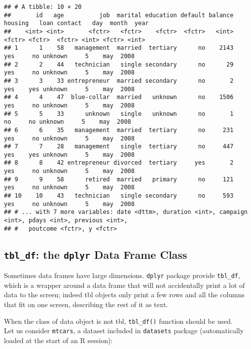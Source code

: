 \documentclass[]{book}
\begin{document}
\begin{verbatim}
## # A tibble: 10 × 20
##       id   age          job  marital education default balance housing   loan contact   day  month  year
##    <int> <int>       <fctr>   <fctr>    <fctr>  <fctr>   <int>  <fctr> <fctr>  <fctr> <int> <fctr> <int>
## 1      1    58   management  married  tertiary      no    2143     yes     no unknown     5    may  2008
## 2      2    44   technician   single secondary      no      29     yes     no unknown     5    may  2008
## 3      3    33 entrepreneur  married secondary      no       2     yes    yes unknown     5    may  2008
## 4      4    47  blue-collar  married   unknown      no    1506     yes     no unknown     5    may  2008
## 5      5    33      unknown   single   unknown      no       1      no     no unknown     5    may  2008
## 6      6    35   management  married  tertiary      no     231     yes     no unknown     5    may  2008
## 7      7    28   management   single  tertiary      no     447     yes    yes unknown     5    may  2008
## 8      8    42 entrepreneur divorced  tertiary     yes       2     yes     no unknown     5    may  2008
## 9      9    58      retired  married   primary      no     121     yes     no unknown     5    may  2008
## 10    10    43   technician   single secondary      no     593     yes     no unknown     5    may  2008
## # ... with 7 more variables: date <dttm>, duration <int>, campaign <int>, pdays <int>, previous <int>,
## #   poutcome <fctr>, y <fctr>
\end{verbatim}

\subsection{\texorpdfstring{\texttt{tbl\_df}: the \texttt{dplyr} Data
Frame
Class}{tbl\_df: the dplyr Data Frame Class}}\label{tbl_df-the-dplyr-data-frame-class}

Sometimes data frames have large dimensions. \texttt{dplyr} package
provide \texttt{tbl\_df}, which is a wrapper around a data frame that
will not accidentally print a lot of data to the screen; indeed tbl
objects only print a few rows and all the columns that fit on one
screen, describing the rest of it as text.

When the class of data object is not tbl, \texttt{tbl\_df()} function
should be used.\\
Let us consider \texttt{mtcars}, a dataset included in \texttt{datasets}
package (automatically loaded at the start of an R session):
\end{document}
